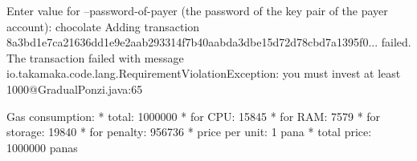 \begin{shellbox}\begin{ttlst}
Enter value for --password-of-payer (the password of the key pair of the payer account): chocolate
Adding transaction 8a3bd1e7ca21636dd1e9e2aab293314f7b40aabda3dbe15d72d78cbd7a1395f0... failed.
The transaction failed with message io.takamaka.code.lang.RequirementViolationException: you must invest at least 1000@GradualPonzi.java:65

Gas consumption:
 * total: 1000000
   * for CPU: 15845
   * for RAM: 7579
   * for storage: 19840
   * for penalty: 956736
 * price per unit: 1 pana
 * total price: 1000000 panas
\end{ttlst}\end{shellbox}
